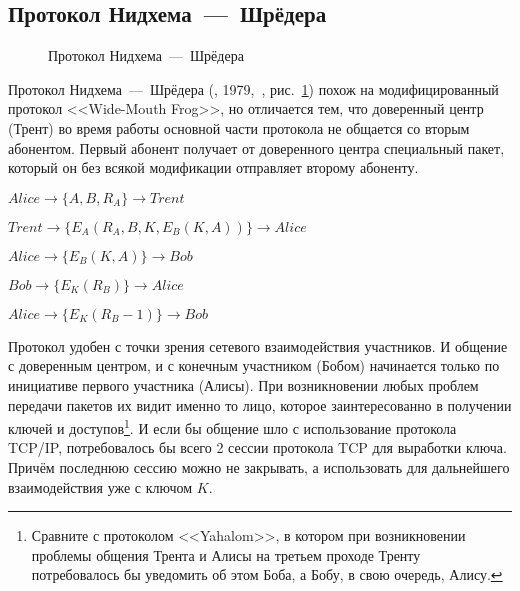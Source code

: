 \subsection{Протокол Нидхема~---~Шрёдера}\label{section-protocols-needham-schroeder}

\begin{figure}
	\centering
	\begin{sequencediagram}
		
	\end{sequencediagram}
	\caption{Протокол Нидхема~---~Шрёдера\label{fig:key_distribution-needham-schroeder}}
\end{figure}

Протокол Нидхема~---~Шрёдера (, 1979,~\cite{Needham:Schroeder:1978}, рис.~\ref{fig:key_distribution-needham-schroeder}) похож на модифицированный протокол <<Wide-Mouth Frog>>, но отличается тем, что доверенный центр (Трент) во время работы основной части протокола не общается со вторым абонентом. Первый абонент получает от доверенного центра специальный пакет, который он без всякой модификации отправляет второму абоненту.

\begin{protocol}
	\item[(1)] $ Alice	\to \{ A, B, R_A \}						\to Trent $
	\item[(2)] $ Trent	\to \{ E_A \left( R_A, B, K, E_B \left( K, A \right) \right) \}	\to Alice $
	\item[(3)] $ Alice	\to \{ E_B \left( K, A \right) \}				\to Bob $
	\item[(4)] $ Bob	\to \{ E_K \left( R_B \right) \}				\to Alice $
	\item[(5)] $ Alice	\to \{ E_K \left( R_B - 1 \right) \}				\to Bob $
\end{protocol}

Протокол удобен с точки зрения сетевого взаимодействия участников. И общение с доверенным центром, и с конечным участником (Бобом) начинается только по инициативе первого участника (Алисы). При возникновении любых проблем передачи пакетов их видит именно то лицо, которое заинтересованно в получении ключей и доступов\footnote{Сравните с протоколом <<Yahalom>>, в котором при возникновении проблемы общения Трента и Алисы на третьем проходе Тренту потребовалось бы уведомить об этом Боба, а Бобу, в свою очередь, Алису.}. И если бы общение шло с использование протокола TCP/IP, потребовалось бы всего 2 сессии протокола TCP для выработки ключа. Причём последнюю сессию можно не закрывать, а использовать для дальнейшего взаимодействия уже с ключом $K$.

